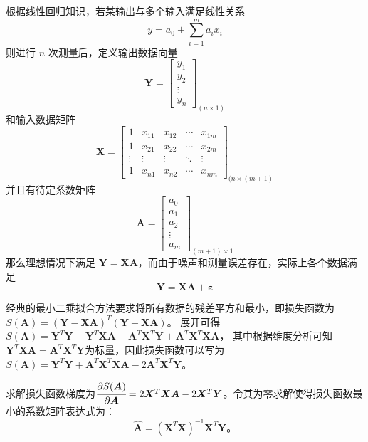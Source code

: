 根据线性回归知识，若某输出与多个输入满足线性关系
\begin{equation*}
    y=a_{0}+\sum_{i=1}^m a_{i}x_{i}
\end{equation*}
则进行 \(n\) 次测量后，定义输出数据向量
\begin{equation*}
\bm{Y}=\begin{bmatrix}
y_{1}\\ y_{2}\\ \vdots \\ y_{n}
\end{bmatrix}
_{(n\times 1)}
\end{equation*}
和输入数据矩阵
\begin{equation*}
\bm{X}=\begin{bmatrix}
1 & x_{11} & x_{12} & \cdots & x_{1m}\\
1 & x_{21} & x_{22} & \cdots & x_{2m}\\
\vdots & \vdots & \vdots & \ddots & \vdots\\
1 & x_{n1} & x_{n2} & \cdots & x_{nm}
\end{bmatrix}
_{(n\times (m+1)}
\end{equation*}
并且有待定系数矩阵
\begin{equation*}
\bm{A}=\begin{bmatrix}
a_{0}\\ a_{1}\\ a_{2}\\ \vdots\\ a_{m}
\end{bmatrix}
_{(m+1)\times 1}
\end{equation*}
那么理想情况下满足 \(\bm{Y}=\bm{X}\bm{A}\)，而由于噪声和测量误差存在，实际上各个数据满足
\begin{equation*}
\bm{Y}=\bm{X}\bm{A}+\bm{\varepsilon}
\end{equation*}

经典的最小二乘拟合方法要求将所有数据的残差平方和最小，即损失函数为\(S(\bm{A})=(\bm{Y}-\bm{X}\bm{A})^T(\bm{Y}-\bm{X}\bm{A})\)。
展开可得\(S(\bm{A})=\bm{Y}^T\bm{Y}-\bm{Y}^T\bm{X}\bm{A}-\bm{A}^T\bm{X}^T\bm{Y}+\bm{A}^T\bm{X}^T\bm{XA}\)，
其中根据维度分析可知\(\bm{Y}^T\bm{XA}=\bm{A}^T\bm{X}^T\bm{Y}\)为标量，因此损失函数可以写为
\(S(\bm{A})=\bm{Y}^T\bm{Y}+\bm{A}^T\bm{X}^T\bm{XA}-2\bm{A}^T\bm{X}^T\bm{Y}\)。

求解损失函数梯度为\(\cfrac{\partial S(\bm{A})}{\partial \bm{A}}=2\bm{X}^T\bm{XA}-2\bm{X}^T\bm{Y}\)。令其为零求解使得损失函数最小的系数矩阵表达式为：
\begin{equation}
    \hat{\bm{A}}=(\bm{X}^T\bm{X})^{-1}\bm{X}^T\bm{Y}。
    \label{eq:多元线性回归公式}
\end{equation}

